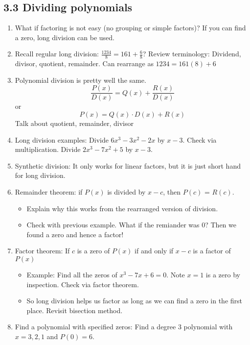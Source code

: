 \documentclass{article}
\begin{document}
\subsection{3.3 Dividing polynomials}

\begin{enumerate}
\item What if factoring is not easy (no grouping or simple factors)? If you can find a zero, long division can be used.

\item Recall regular long division: $\frac{1234}{8} = 161 + \frac{6}{8}$? Review terminology: Dividend, divisor, quotient, remainder. Can rearrange as $1234 = 161(8) + 6$

\item Polynomial division is pretty well the same.
$$
\frac{P(x)}{D(x)} = Q(x) + \frac{R(x)}{D(x)}
$$
or
$$
P(x) = Q(x)\cdot D(x) + R(x)
$$
Talk about quotient, remainder, divisor

\item Long division examples: Divide $6x^3-3x^2-2x$ by $x-3$. Check via multiplication. Divide $2x^3-7x^2+5$ by $x-3$. 

\item Synthetic division: It only works for linear factors, but it is just short hand for long division.

\item Remainder theorem: if $P(x)$ is divided by $x-c$, then $P(c)$  = $R(c)$. 
\begin{itemize}
\item Explain why this works from the rearranged version of division. 
\item Check with previous example. What if the remiander was 0? Then we found a zero and hence a factor!
\end{itemize}

\item Factor theorem: If $c$ is a zero of $P(x)$ if and only if $x-c$ is a factor of $P(x)$
\begin{itemize}
\item Example: Find all the zeros of $x^3-7x+6= 0$. Note $x=1$ is a zero by inspection. Check via factor theorem.
\item So long division helps us factor as long as we can find a zero in the first place. Revisit bisection method.
\end{itemize}

\item Find a polynomial with specified zeros: Find a degree 3 polynomial with $x=3,2,1$ and $P(0) = 6$.
\end{enumerate}
\end{document}
